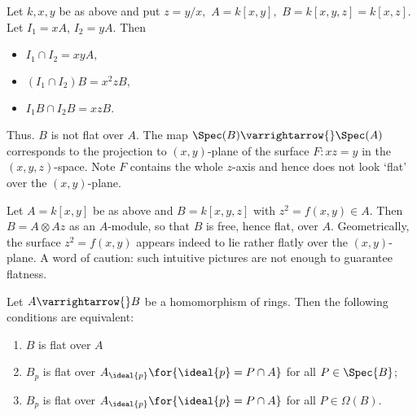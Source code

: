 \documentclass[../main]{subfiles}
\begin{document}
\begin{example}
    Let $k, x, y$ be as above and put  $z = y/x,$  $A = k[x,y],$  $B=k[x,y,z]=k[x,z].$ Let $I_1=xA$, $I_2=yA.$ Then 
    \begin{itemize}
        \item $I_1 \cap I_2 = xyA,$
        \item  $(I_1 \cap I_2)B = x^{2}zB,$
        \item $I_1B \cap I_2B = xzB$.
    \end{itemize}
      Thus. $B$ is not flat over $A$. The map $\Spec(B) \varrightarrow{}  \Spec(A) $ corresponds to the projection to $(x,y)$-plane of the surface $F\colon xz = y  $ in the $(x,y,z)$-space. Note $F$ contains the whole $z$-axis and hence does not look `flat' over the $(x,y)$-plane.
\end{example}

\begin{example}
Let $A = k[x,y]$ be as above and $B = k[x,y,z]$ with \newline $z^{2}=f(x,y) \in A$. Then $B = A \otimes Az$ as an $A$-module, so that $B$ is free, hence flat, over $A$. Geometrically, the surface $z^{2}=f(x,y)$ appears indeed to lie rather flatly over the $(x,y)$-plane. A word of caution: such intuitive pictures are not enough to guarantee flatness.
\end{example}

\newparagraph Let $A \varrightarrow{} B$ be a homomorphism of rings. Then the following conditions are equivalent:
\begin{enumerate} [label=(\arabic*)]
    \item $B$ is flat over $A$
    \item $B_p$ is flat over $A_{\ideal{p}}\for{\ideal{p} = P \cap A}$ for all $P \in \Spec{B}$; 
    \item $B_p$ is flat over $A_{\ideal{p} }\for{\ideal{p} = P \cap A}$ for all $P \in \Omega(B)$.
\end{enumerate}
\end{document}

